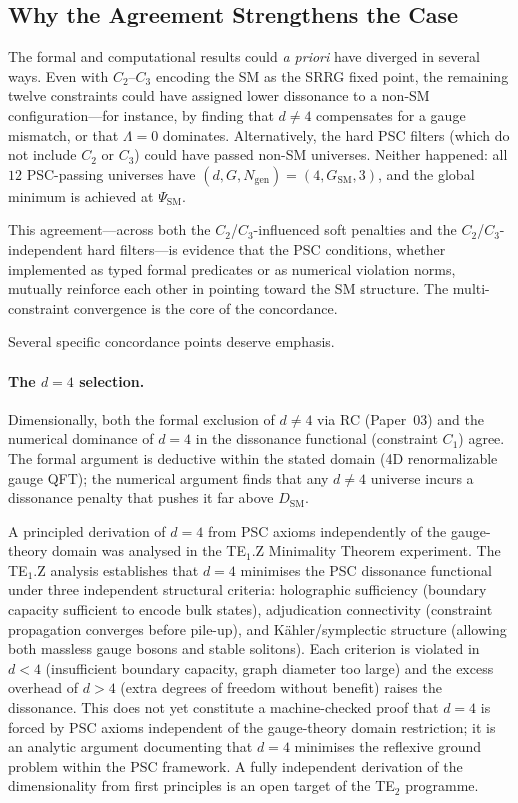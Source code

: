 \documentclass[11pt,twocolumn]{article}
\theoremstyle{remark}
\begin{document}
\subsection{Why the Agreement Strengthens the Case}
\label{sec:strengthening}

The formal and computational results could \emph{a priori} have
diverged in several ways.
Even with $C_2$--$C_3$ encoding the SM as the SRRG fixed point, the
remaining twelve constraints could have assigned lower dissonance
to a non-SM configuration---for instance, by finding that $d\neq 4$
compensates for a gauge mismatch, or that $\Lambda=0$ dominates.
Alternatively, the hard PSC filters (which do not include $C_2$ or
$C_3$) could have passed non-SM universes.
Neither happened: all $12$ PSC-passing universes have
$(d,G,N_{\mathrm{gen}})=(4,G_{\mathrm{SM}},3)$, and the global
minimum is achieved at $\Psi_{\mathrm{SM}}$.

This agreement---across both the $C_2$/$C_3$-influenced soft penalties
and the $C_2$/$C_3$-independent hard filters---is evidence that the
PSC conditions, whether implemented as typed formal predicates or as
numerical violation norms, mutually reinforce each other in pointing
toward the SM structure.
The multi-constraint convergence is the core of the concordance.

Several specific concordance points deserve emphasis.

\paragraph{The $d=4$ selection.}
Dimensionally, both the formal exclusion of $d\neq 4$ via RC
(Paper~03) and the numerical dominance of $d=4$ in the dissonance
functional (constraint $C_1$) agree.
The formal argument is deductive within the stated domain (4D
renormalizable gauge QFT); the numerical argument finds that
any $d\neq 4$ universe incurs a dissonance penalty that pushes it
far above $D_{\mathrm{SM}}$.

A principled derivation of $d=4$ from PSC axioms independently of
the gauge-theory domain was analysed in the TE$_1$.Z Minimality
Theorem experiment.
The TE$_1$.Z analysis establishes that $d=4$ minimises the PSC
dissonance functional under three independent structural criteria:
holographic sufficiency (boundary capacity sufficient to encode bulk
states), adjudication connectivity (constraint propagation converges
before pile-up), and Kähler/symplectic structure (allowing both massless
gauge bosons and stable solitons).
Each criterion is violated in $d<4$ (insufficient boundary capacity,
graph diameter too large) and the excess overhead of $d>4$ (extra degrees
of freedom without benefit) raises the dissonance.
This does not yet constitute a machine-checked proof that $d=4$ is forced
by PSC axioms independent of the gauge-theory domain restriction; it is an
analytic argument documenting that $d=4$ minimises the reflexive ground
problem within the PSC framework.
A fully independent derivation of the dimensionality from first principles
is an open target of the TE$_2$ programme.
\end{document}
